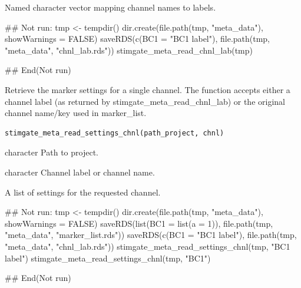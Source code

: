 \documentclass[letterpaper]{book}
\begin{document}
%
\begin{Value}
Named character vector mapping channel names to labels.
\end{Value}
%
\begin{Examples}
\begin{ExampleCode}
## Not run: 
tmp <- tempdir()
dir.create(file.path(tmp, "meta_data"), showWarnings = FALSE)
saveRDS(c(BC1 = "BC1 label"), file.path(tmp, "meta_data", "chnl_lab.rds"))
stimgate_meta_read_chnl_lab(tmp)

## End(Not run)
\end{ExampleCode}
\end{Examples}
%
\begin{Description}
Retrieve the marker settings for a single channel. The function
accepts either a channel label (as returned by stimgate\_meta\_read\_chnl\_lab)
or the original channel name/key used in marker\_list.
\end{Description}
%
\begin{Usage}
\begin{verbatim}
stimgate_meta_read_settings_chnl(path_project, chnl)
\end{verbatim}
\end{Usage}
%
\begin{Arguments}
\begin{ldescription}
\item[\code{path\_project}] character Path to project.

\item[\code{chnl}] character Channel label or channel name.
\end{ldescription}
\end{Arguments}
%
\begin{Value}
A list of settings for the requested channel.
\end{Value}
%
\begin{Examples}
\begin{ExampleCode}
## Not run: 
tmp <- tempdir()
dir.create(file.path(tmp, "meta_data"), showWarnings = FALSE)
saveRDS(list(BC1 = list(a = 1)), file.path(tmp, "meta_data", "marker_list.rds"))
saveRDS(c(BC1 = "BC1 label"), file.path(tmp, "meta_data", "chnl_lab.rds"))
stimgate_meta_read_settings_chnl(tmp, "BC1 label")
stimgate_meta_read_settings_chnl(tmp, "BC1")

## End(Not run)
\end{ExampleCode}
\end{Examples}
\end{document}
